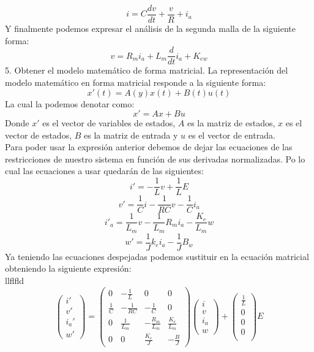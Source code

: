 \begin{equation}
i=C\frac{dv}{dt}+\frac{v}{R}+i_a
\end{equation}
Y finalmente podemos expresar el análisis de la segunda malla de la siguiente forma:
\begin{equation}
v=R_mi_a+L_m\frac{d}{dt}i_a+K_{ew}
\end{equation}
5. Obtener el modelo matemático de forma matricial.
La representación del modelo matemático en forma matricial responde a la siguiente forma:
\begin{equation}
x'(t)=A(y)x(t)+B(t)u(t)
\end{equation}
La cual la podemos denotar como:
\begin{equation}
x'=Ax+Bu
\end{equation}
Donde $x'$ es el vector de variables de estados, $A$ es la matriz de estados, $x$ es el vector de estados, $B$ es la matriz de entrada y $u$ es el vector de entrada.\\
Para poder usar la expresión anterior debemos de dejar las ecuaciones de las restricciones de nuestro sistema en función de sus derivadas normalizadas. Po lo cual las ecuaciones a usar quedarán de las siguientes:
\begin{equation}
i'=-\frac{1}{L}v+\frac{1}{L}E
\end{equation}
\begin{equation}
v'=\frac{1}{C}i-\frac{1}{RC}v-\frac{1}{C}i_a
\end{equation}
\begin{equation}
i'_a=\frac{1}{L_m}v-\frac{1}{L_m}R_mi_a-\frac{K_e}{L_m}w
\end{equation}
\begin{equation}
w'=\frac{1}{J}k_ei_a-\frac{1}{J}B_w
\end{equation}
Ya teniendo las ecuaciones despejadas podemos sustituir en la ecuación matricial obteniendo la siguiente expresión:\\
llflfld
\begin{equation}
\begin{pmatrix}
i'\\
v'\\
i_a'\\
w' 
\end{pmatrix}
=
\begin{pmatrix}
0 & -\frac{1}{L} & 0 & 0\\
\frac{1}{C} & -\frac{1}{RC} & -\frac{1}{C} & 0\\
0 & \frac{1}{L_m} & -\frac{R_m}{L_m} & \frac{K_e}{L_m}\\
0 & 0 & \frac{K_e}{J} & -\frac{B}{J}
\end{pmatrix}
\begin{pmatrix}
i\\
v\\
i_a\\
w
\end{pmatrix}
+
\begin{pmatrix}
\frac{1}{L}\\
0\\
0\\
0\\
\end{pmatrix}
E
\end{equation}
